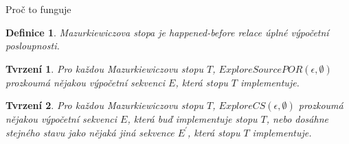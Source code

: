 \documentclass[11pt]{beamer}
\newtheorem{dfn}{Definice}
\newtheorem{tvrzeni}{Tvrzení}
\begin{document}
\begin{frame}{Proč to funguje}
\pause
\begin{dfn}
Mazurkiewiczova stopa je happened-before relace úplné výpočetní posloupnosti.
\end{dfn}

\pause
\begin{tvrzeni}
Pro každou Mazurkiewiczovu stopu $T$, $\textit{ExploreSourcePOR}(\epsilon, \emptyset)$
prozkoumá nějakou výpočetní sekvenci $E$, která stopu $T$ implementuje.
\end{tvrzeni}

\pause
\begin{tvrzeni}
Pro každou Mazurkiewiczovu stopu $T$, $\textit{ExploreCS}(\epsilon, \emptyset)$
prozkoumá nějakou výpočetní sekvenci $E$, která buď implementuje stopu $T$,
nebo dosáhne stejného stavu jako nějaká jiná sekvence $E^\prime$, která stopu $T$ implementuje.
\end{tvrzeni}

%
\end{frame}
\end{document}

